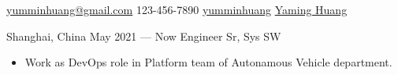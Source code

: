\documentclass{resume}
\begin{document}
{\href{mailto:yumminhuang@gmail.com}{yumminhuang@gmail.com}}
{123-456-7890}
{\href{https://github.com/yumminhuang}{yumminhuang}}
{\href{https://www.linkedin.com/in/yaming-huang-6a09325b}{Yaming Huang}}
{}


\smallskip
\begin{body}
	{Shanghai, China}
	{May 2021 --- Now}
	{Engineer Sr, Sys SW}
	\begin{itemize}[noitemsep,topsep=0pt]
		\item Work as DevOps role in Platform team of Autonamous Vehicle department.
	\end{itemize}
\end{body}
\end{document}

